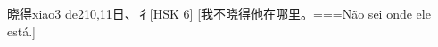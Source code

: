\begin{EntryWithPhonetic}{晓得}{xiao3 de2}{10,11}{⽇、⼻}[HSK 6]
  [我不晓得他在哪里。===Não sei onde ele está.]
\end{EntryWithPhonetic}

